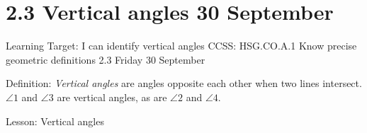 \section{2.3 Vertical angles \hfill 30 September}
\begin{frame}{Learning Target: I can identify vertical angles}
  {CCSS: HSG.CO.A.1 Know precise geometric definitions  \hfill \alert{2.3 Friday 30 September}}
  
    Definition: \emph{Vertical angles} are angles opposite each other when two lines intersect. $\angle 1$ and $\angle 3$ are vertical angles, as are $\angle 2$ and $\angle 4$.
  \begin{center}
  \end{center}
    Lesson: Vertical angles
  \end{frame}
  
